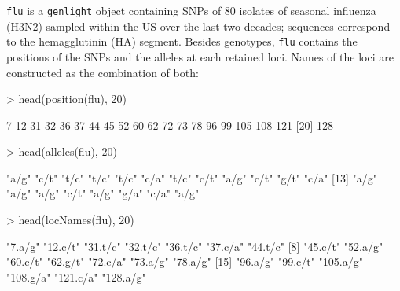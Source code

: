 \documentclass{article}
\begin{document}
\noindent \texttt{flu} is a \texttt{genlight} object containing SNPs of 80 isolates of seasonal
influenza (H3N2) sampled within the US over the last two decades; sequences correspond to the
hemagglutinin (HA) segment.
Besides genotypes, \texttt{flu} contains the positions of the SNPs and the alleles at each retained loci.
Names of the loci are constructed as the combination of both:
\begin{Schunk}
\begin{Sinput}
> head(position(flu), 20)
\end{Sinput}
\begin{Soutput}
 [1]   7  12  31  32  36  37  44  45  52  60  62  72  73  78  96  99 105 108 121
[20] 128
\end{Soutput}
\begin{Sinput}
> head(alleles(flu), 20)
\end{Sinput}
\begin{Soutput}
 [1] "a/g" "c/t" "t/c" "t/c" "t/c" "c/a" "t/c" "c/t" "a/g" "c/t" "g/t" "c/a"
[13] "a/g" "a/g" "a/g" "c/t" "a/g" "g/a" "c/a" "a/g"
\end{Soutput}
\begin{Sinput}
> head(locNames(flu), 20)
\end{Sinput}
\begin{Soutput}
 [1] "7.a/g"   "12.c/t"  "31.t/c"  "32.t/c"  "36.t/c"  "37.c/a"  "44.t/c" 
 [8] "45.c/t"  "52.a/g"  "60.c/t"  "62.g/t"  "72.c/a"  "73.a/g"  "78.a/g" 
[15] "96.a/g"  "99.c/t"  "105.a/g" "108.g/a" "121.c/a" "128.a/g"
\end{Soutput}
\end{Schunk}
\end{document}
